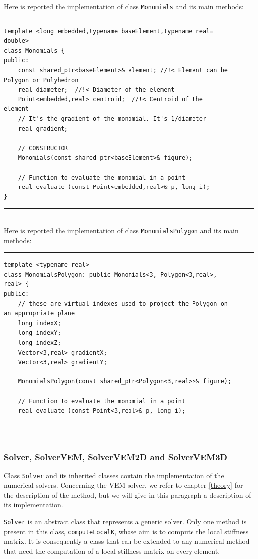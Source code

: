 Here is reported the implementation of class \verb|Monomials| and its main methods:

\noindent\rule{12.7cm}{1pt}
\begin{verbatim}
template <long embedded,typename baseElement,typename real=
double>
class Monomials {
public:
    const shared_ptr<baseElement>& element;	//!< Element can be 
Polygon or Polyhedron
    real diameter;  //!< Diameter of the element
    Point<embedded,real> centroid;  //!< Centroid of the 
element
    // It's the gradient of the monomial. It's 1/diameter
    real gradient;

    // CONSTRUCTOR
    Monomials(const shared_ptr<baseElement>& figure);

    // Function to evaluate the monomial in a point
    real evaluate (const Point<embedded,real>& p, long i);
}
\end{verbatim}
\noindent\rule{12.7cm}{1pt}\\

Here is reported the implementation of class \verb|MonomialsPolygon| and its main methods:

\noindent\rule{12.7cm}{1pt}
\begin{verbatim}
template <typename real>
class MonomialsPolygon: public Monomials<3, Polygon<3,real>,
real> {
public:
    // these are virtual indexes used to project the Polygon on
an appropriate plane
    long indexX;
    long indexY;
    long indexZ;
    Vector<3,real> gradientX;
    Vector<3,real> gradientY;
	
    MonomialsPolygon(const shared_ptr<Polygon<3,real>>& figure); 
    
    // Function to evaluate the monomial in a point
    real evaluate (const Point<3,real>& p, long i);
\end{verbatim}

\noindent\rule{12.7cm}{1pt}\\

\subsubsection{Solver, SolverVEM, SolverVEM2D and SolverVEM3D}
Class \verb|Solver| and its inherited classes contain the implementation of the numerical solvers. Concerning the VEM solver, we refer to chapter \ref{theory} for the description of the method, but we will give in this paragraph a description of its implementation. 

\verb|Solver| is an abstract class that represents a generic solver. Only one method is present in this class, \verb|computeLocalK|, whose aim is to compute the local stiffness matrix. It is consequently a class that can be extended to any numerical method that need the computation of a local stiffness matrix on every element. 

